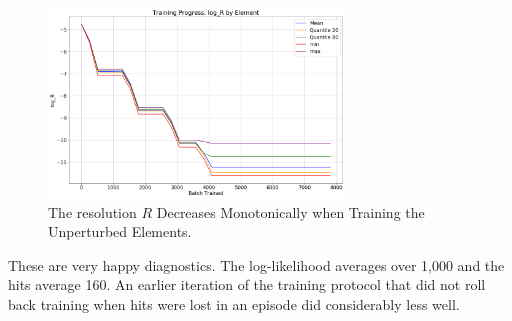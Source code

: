 \begin{figure}[hbt!]
\begin{center}
\includegraphics[width=0.7\textwidth]{../figs/search_known/unperturbed/learning_curve_log_R.png}
\end{center}
\caption[The resolution $R$ Decreases Monotonically when Training the Unperturbed Elements]
{The resolution $R$ Decreases Monotonically when Training the Unperturbed Elements.}
\label{fig:TrainUnperturbedRes}
\end{figure}
These are very happy diagnostics.  The log-likelihood averages over 1,000 and the hits average 160.
An earlier iteration of the training protocol that did not roll back training when hits were 
lost in an episode did considerably less well.

